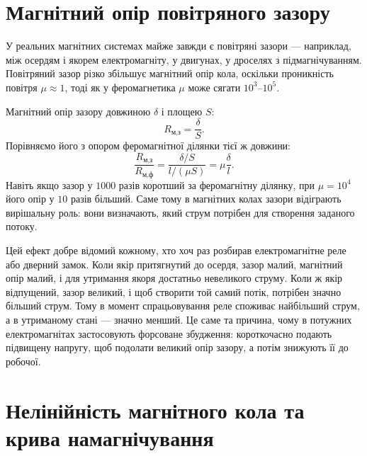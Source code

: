 \documentclass[]{ConspectBook}
\begin{document}
\section{Магнітний опір повітряного зазору}

У реальних магнітних системах майже завжди є повітряні зазори --- наприклад, між осердям і якорем електромагніту, у двигунах, у дроселях з підмагнічуванням. Повітряний зазор різко збільшує магнітний опір кола, оскільки проникність повітря $\mu \approx 1$, тоді як у феромагнетика $\mu$ може сягати $10^3$--$10^5$.

Магнітний опір зазору довжиною $\delta$ і площею $S$:
\begin{equation}\label{eq:air_gap_reluctance}
	R_{\text{м,з}} = \frac{\delta}{S}.
\end{equation}
Порівняємо його з опором феромагнітної ділянки тієї ж довжини:
\begin{equation}\label{eq:reluctance_ratio}
	\frac{R_{\text{м,з}}}{R_{\text{м,ф}}} = \frac{\delta/S}{l/(\mu S)} = \mu \frac{\delta}{l}.
\end{equation}
Навіть якщо зазор у $1000$ разів коротший за феромагнітну ділянку, при $\mu = 10^4$ його опір у $10$ разів більший. Саме тому в магнітних колах зазори відіграють вирішальну роль: вони визначають, який струм потрібен для створення заданого потоку.

\begin{Attention}
	Цей ефект добре відомий кожному, хто хоч раз розбирав електромагнітне реле або дверний замок. Коли якір притягнутий до осердя, зазор малий, магнітний опір малий, і для утримання якоря достатньо невеликого струму. Коли ж якір відпущений, зазор великий, і щоб створити той самий потік, потрібен значно більший струм. Тому в момент спрацьовування реле споживає найбільший струм, а в утриманому стані --- значно менший. Це саме та причина, чому в потужних електромагнітах застосовують форсоване збудження: короткочасно подають підвищену напругу, щоб подолати великий опір зазору, а потім знижують її до робочої.
\end{Attention}

\section{Нелінійність магнітного кола та крива намагнічування}
\end{document}

